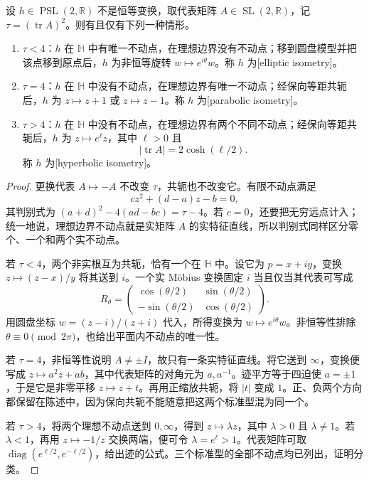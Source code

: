 \begin{theorem}\label{g1:thm:psl-element-classification}
	设 \(h\in\operatorname{PSL}(2,\mathbb R)\) 不是恒等变换，取代表矩阵 \(A\in\operatorname{SL}(2,\mathbb R)\)，记 \(\tau=(\operatorname{tr}A)^2\)。则有且仅有下列一种情形。
	\begin{enumerate}
		\item \(\tau<4\)：\(h\) 在 \(\mathbb H\) 中有唯一不动点，在理想边界没有不动点；移到圆盘模型并把该点移到原点后，\(h\) 为非恒等旋转 \(w\mapsto e^{i\theta}w\)。称 \(h\) 为[elliptic isometry]。
		\item \(\tau=4\)：\(h\) 在 \(\mathbb H\) 中没有不动点，在理想边界有唯一不动点；经保向等距共轭后，\(h\) 为 \(z\mapsto z+1\) 或 \(z\mapsto z-1\)。称 \(h\) 为[parabolic isometry]。
		\item \(\tau>4\)：\(h\) 在 \(\mathbb H\) 中没有不动点，在理想边界有两个不同不动点；经保向等距共轭后，\(h\) 为 \(z\mapsto e^\ell z\)，其中 \(\ell>0\) 且
		\[
			|\operatorname{tr}A|=2\cosh(\ell/2).
		\]
		称 \(h\) 为[hyperbolic isometry]。
	\end{enumerate}
\end{theorem}
\begin{proof}
	更换代表 \(A\mapsto-A\) 不改变 \(\tau\)，共轭也不改变它。有限不动点满足
	\[
		cz^2+(d-a)z-b=0,
	\]
	其判别式为 \((a+d)^2-4(ad-bc)=\tau-4\)。若 \(c=0\)，还要把无穷远点计入；统一地说，理想边界不动点就是实矩阵 \(A\) 的实特征直线，所以判别式同样区分零个、一个和两个实不动点。

	若 \(\tau<4\)，两个非实根互为共轭，恰有一个在 \(\mathbb H\) 中。设它为 \(p=x+iy\)，变换 \(z\mapsto(z-x)/y\) 将其送到 \(i\)。一个实 Möbius 变换固定 \(i\) 当且仅当其代表可写成
	\[
		R_\theta=\begin{pmatrix}
			\cos(\theta/2)&\sin(\theta/2)\\
			-\sin(\theta/2)&\cos(\theta/2)
		\end{pmatrix}.
	\]
	用圆盘坐标 \(w=(z-i)/(z+i)\) 代入，所得变换为 \(w\mapsto e^{i\theta}w\)。非恒等性排除 \(\theta\equiv0\pmod{2\pi}\)，也给出平面内不动点的唯一性。

	若 \(\tau=4\)，非恒等性说明 \(A\ne\pm I\)，故只有一条实特征直线。将它送到 \(\infty\)，变换便写成 \(z\mapsto a^2z+ab\)，其中代表矩阵的对角元为 \(a,a^{-1}\)。迹平方等于四迫使 \(a=\pm1\)，于是它是非零平移 \(z\mapsto z+t\)。再用正缩放共轭，将 \(|t|\) 变成 \(1\)。正、负两个方向都保留在陈述中，因为保向共轭不能随意把这两个标准型混为同一个。

	若 \(\tau>4\)，将两个理想不动点送到 \(0,\infty\)，得到 \(z\mapsto\lambda z\)，其中 \(\lambda>0\) 且 \(\lambda\ne1\)。若 \(\lambda<1\)，再用 \(z\mapsto-1/z\) 交换两端，便可令 \(\lambda=e^\ell>1\)。代表矩阵可取 \(\operatorname{diag}(e^{\ell/2},e^{-\ell/2})\)，给出迹的公式。三个标准型的全部不动点均已列出，证明分类。
\end{proof}

